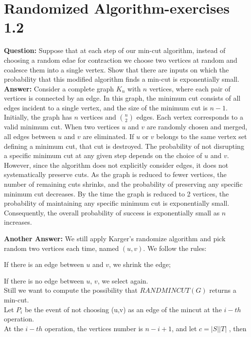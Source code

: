 \documentclass[12pt]{article}
\begin{document}
\section{Randomized Algorithm-exercises 1.2}
\textbf{Question:}
Suppose that at each step of our min-cut algorithm, instead of choosing a random edae for contraction we choose two vertices at random and coalesce them into a single vertex. Show that there are inputs on which the probability that this modified algorithm finds a min-cut is exponentially small.\\
\textbf{Answer:}
Consider a complete graph \( K_n \) with \( n \) vertices, where each pair of vertices is connected by an edge. In this graph, the minimum cut consists of all edges incident to a single vertex, and the size of the minimum cut is \( n-1 \). Initially, the graph has \( n \) vertices and \( \binom{n}{2} \) edges. Each vertex corresponds to a valid minimum cut. When two vertices \( u \) and \( v \) are randomly chosen and merged, all edges between \( u \) and \( v \) are eliminated. If \( u \) or \( v \) belongs to the same vertex set defining a minimum cut, that cut is destroyed. The probability of not disrupting a specific minimum cut at any given step depends on the choice of \( u \) and \( v \). However, since the algorithm does not explicitly consider edges, it does not systematically preserve cuts. As the graph is reduced to fewer vertices, the number of remaining cuts shrinks, and the probability of preserving any specific minimum cut decreases. By the time the graph is reduced to 2 vertices, the probability of maintaining any specific minimum cut is exponentially small. Consequently, the overall probability of success is exponentially small as \( n \) increases.

\textbf{Another Answer:}
We still apply Karger's randomize algorithm and pick random two vertices each time, named $(u,v)$. We follow the rules:

If there is an edge between $u$ and $v$, we shrink the edge;

If there is no edge between $u$, $v$, we select again. \\
Still we want to compute the possibility that $RANDMINCUT(G)$ returns a min-cut.\\
Let $P_i$ be the event of not choosing (u,v) as an edge of the mincut at the $i-th$ operation.\\
At the $i-th$ operation, the vertices number is $n-i+1$, and let $c=|S||T|$ , then\\
\end{document}

